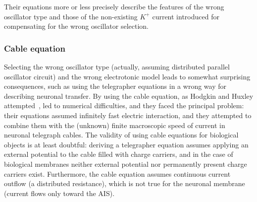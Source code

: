 Their equations more or less precisely describe
the features of the wrong oscillator type and those of the
non-existing $K^+$ current introduced for compensating for the wrong oscillator selection.


\subsubsection{Cable equation\label{Physiology-HHCableEquation}}

Selecting the wrong oscillator type (actually, assuming distributed parallel
oscillator circuit) and the wrong electrotonic model
leads to somewhat surprising consequences,
such as using the telegrapher equations in a wrong way for
describing neuronal transfer.
By using the cable equation, as Hodgkin and Huxley attempted~\cite{HodgkinHuxley:1952}, led to
numerical difficulties, and they faced the principal problem: their
equations assumed infinitely fast electric interaction, and they attempted
to combine them with the (unknown) finite macroscopic speed of current
in neuronal telegraph cables. The validity of using cable equations
for biological objects is at least doubtful: deriving a telegrapher
equation assumes applying an external potential to the cable filled
with charge carriers, and in the case of biological membranes neither
external potential nor permanently present charge carriers exist.
Furthermore, the cable equation assumes continuous current outflow
(a distributed resistance), which is not true for the neuronal membrane
(current flows only toward the \gls{AIS}).


